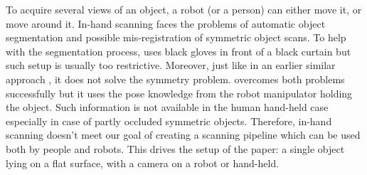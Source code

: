 \documentclass[letterpaper, 10 pt, conference]{ieeeconf}  %
\begin{document}
To acquire several views of an object, a robot (or a person) can either move it, or move around it. In-hand scanning faces the problems
of automatic object segmentation and possible mis-registration of symmetric object scans. To help with the segmentation 
process,
\cite{weise2011online} uses black gloves in front of a black curtain but such setup is usually too restrictive.
Moreover, just like in an earlier similar approach \cite{rusinkiewicz2002real}, it does not solve the symmetry problem. 
\cite{krainin2011manipulator} overcomes both problems successfully but
it uses the pose knowledge from the robot manipulator holding the object.
Such information is not available in the human hand-held case 
especially in case of partly occluded symmetric objects.
Therefore, in-hand scanning doesn't meet our goal of
creating a scanning pipeline which can be used both by people and robots.
This drives the setup of the paper: a single object lying on a flat surface,
with a camera on a robot or hand-held.
\end{document}
